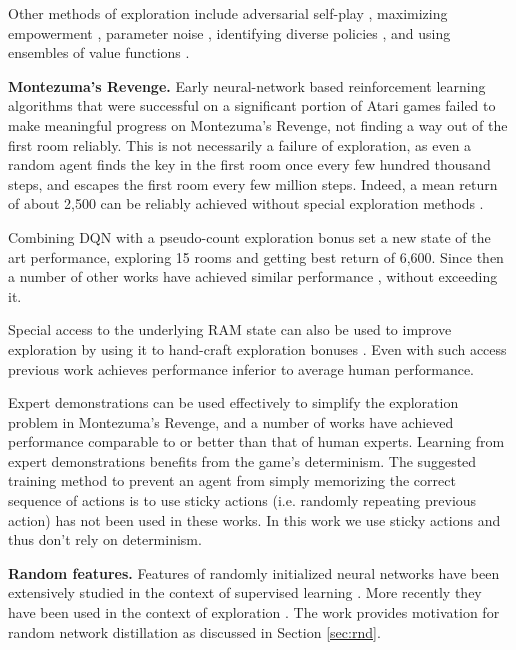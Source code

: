 \documentclass{article} %
\begin{document}
Other methods of exploration include adversarial self-play \citep{sukhbaatar2017intrinsic}, maximizing empowerment \citep{gregor2017variational}, parameter noise \citep{plappert2017parameter, fortunato2017noisy}, identifying diverse policies \citep{diyn, achiam2018variational}, and using ensembles of value functions \citep{osband2018randomized,osband2016deep,chen2017ucb}.

\textbf{Montezuma's Revenge.} Early neural-network based reinforcement learning algorithms that were successful on a significant portion of Atari games \citep{dqn,a3c,hessel2017rainbow} failed to make meaningful progress on Montezuma's Revenge, not finding a way out of the first room reliably. This is not necessarily a failure of exploration, as even a random agent finds the key in the first room once every few hundred thousand steps, and escapes the first room every few million steps. Indeed, a mean return of about 2,500 can be reliably achieved without special exploration methods \citep{horgan2018distributed,espeholt2018impala,oh2018self}.

Combining DQN with a pseudo-count exploration bonus \cite{bellemare2016unifying} set a new state of the art performance, exploring 15 rooms and getting best return of 6,600. Since then a number of other works have achieved similar performance \citep{o2017uncertainty,neuralcount,machado2018count,osband2018randomized}, without exceeding it.

Special access to the underlying RAM state can also be used to improve exploration by using it to hand-craft exploration bonuses \citep{kulkarni2016hierarchical,tang2016exploration,stanton2018deep}. Even with such access previous work achieves performance inferior to average human performance.

Expert demonstrations can be used effectively to simplify the exploration problem in Montezuma's Revenge, and a number of works \citep{salimans2018mz, pohlen2018observe,aytar2018playing,garmulewicz2018expert} have achieved performance comparable to or better than that of human experts. Learning from expert demonstrations benefits from the game's determinism. The suggested training method \citep{machado2017revisiting} to prevent an agent from simply memorizing the correct sequence of actions is to use sticky actions (i.e. randomly repeating previous action) has not been used in these works. In this work we use sticky actions and thus don't rely on determinism.

\textbf{Random features.} Features of randomly initialized neural networks have been extensively studied in the context of supervised learning \citep{rahimi2008random, saxe2011random, jarrett2009best, yang2015deep}. More recently they have been used in the context of exploration \citep{osband2018randomized, burda18largescale}. The work \cite{osband2018randomized} provides motivation for random network distillation as discussed in Section \ref{sec:rnd}.
\end{document}
